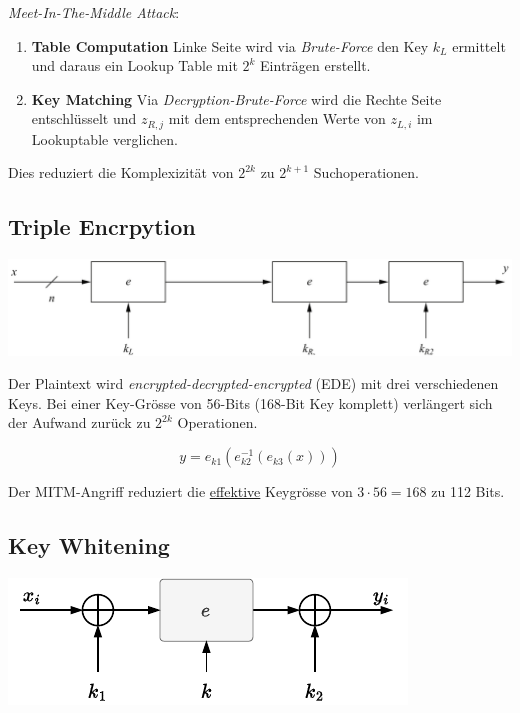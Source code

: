 \documentclass[
  10pt,
  a4paper,
]{article}
\providecommand{\tightlist}{%
  \setlength{\itemsep}{0pt}\setlength{\parskip}{0pt}}\usepackage{longtable,booktabs,array}
\begin{document}
\begin{multicols*}{2}
\emph{Meet-In-The-Middle Attack}:

\begin{enumerate}
\def\labelenumi{\arabic{enumi}.}
\tightlist
\item
  \textbf{Table Computation} Linke Seite wird via \emph{Brute-Force} den
  Key \(k_L\) ermittelt und daraus ein Lookup Table mit \(2^k\)
  Einträgen erstellt.
\item
  \textbf{Key Matching} Via \emph{Decryption-Brute-Force} wird die
  Rechte Seite entschlüsselt und \(z_{R,j}\) mit dem entsprechenden
  Werte von \(z_{L,i}\) im Lookuptable verglichen.
\end{enumerate}

Dies reduziert die Komplexizität von \(2^{2k}\) zu \(2^{k+1}\)
Suchoperationen.

\subsection{Triple Encrpytion}\label{triple-encrpytion}

\includegraphics{images/crypto/image-7.png}

Der Plaintext wird \emph{encrypted-decrypted-encrypted} (EDE) mit drei
verschiedenen Keys. Bei einer Key-Grösse von 56-Bits (168-Bit Key
komplett) verlängert sich der Aufwand zurück zu \(2^{2k}\) Operationen.

\[
y=e_{k1}(e_{k2}^{-1}(e_{k3}(x)))
\]

Der MITM-Angriff reduziert die \ul{effektive} Keygrösse von
\(3\cdot56=168\) zu 112 Bits.

\subsection{Key Whitening}\label{key-whitening}

\begin{center}
\includegraphics{images/crypto/keywhitening.pdf}
\end{center}


\end{multicols*}
\end{document}
